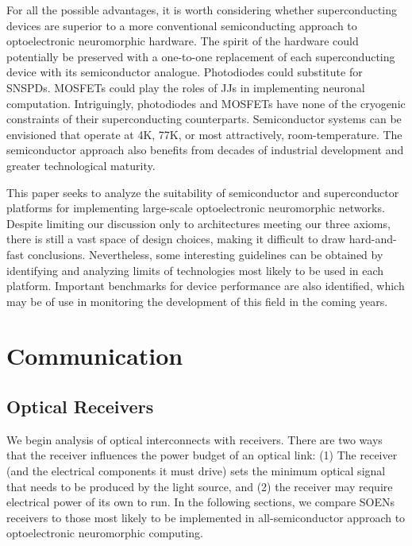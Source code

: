 \documentclass[twocolumn]{article}
\begin{document}
For all the possible advantages, it is worth considering whether superconducting devices are superior to a more conventional semiconducting approach to optoelectronic neuromorphic hardware. The spirit of the hardware could potentially be preserved with a one-to-one replacement of each superconducting device with its semiconductor analogue. Photodiodes could substitute for SNSPDs. MOSFETs could play the roles of JJs in implementing neuronal computation. Intriguingly, photodiodes and MOSFETs have none of the cryogenic constraints of their superconducting counterparts. Semiconductor systems can be envisioned that operate at 4K, 77K, or most attractively, room-temperature. The semiconductor approach also benefits from decades of industrial development and greater technological maturity.

This paper seeks to analyze the suitability of semiconductor and superconductor platforms for implementing large-scale optoelectronic neuromorphic networks. Despite limiting our discussion only to architectures meeting our three axioms, there is still a vast space of design choices, making it difficult to draw hard-and-fast conclusions. Nevertheless, some interesting guidelines can be obtained by identifying and analyzing limits of technologies most likely to be used in each platform. Important benchmarks for device performance are also identified, which may be of use in monitoring the development of this field in the coming years.

\section{\label{sec:communication}Communication}
\subsection{Optical Receivers}
We begin analysis of optical interconnects with receivers. There are two ways that the receiver influences the power budget of an optical link: (1) The receiver (and the electrical components it must drive) sets the minimum optical signal that needs to be produced by the light source, and (2) the receiver may require electrical power of its own to run. In the following sections, we compare SOENs receivers \cite{shainline2019superconducting} to those most likely to be implemented in all-semiconductor approach to optoelectronic neuromorphic computing.
\end{document}
